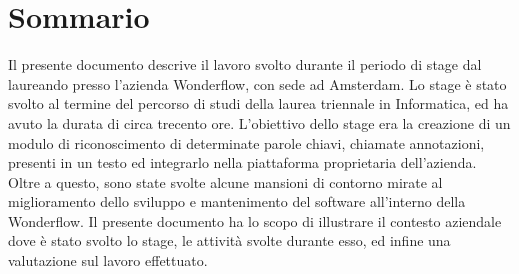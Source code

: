 \cleardoublepage
{}
\chapter*{Sommario}
\thispagestyle{empty}
Il presente documento descrive il lavoro svolto durante il periodo di stage dal
laureando \myName presso l’azienda Wonderflow, con sede ad Amsterdam.
Lo stage è stato svolto al termine del percorso di studi della laurea triennale
in Informatica, ed ha avuto la durata di circa trecento ore.
L’obiettivo dello stage era la creazione di un modulo di riconoscimento di
determinate parole chiavi, chiamate annotazioni, presenti in un testo ed
integrarlo nella piattaforma proprietaria dell'azienda. Oltre a questo, sono
state svolte alcune mansioni di contorno mirate al miglioramento dello sviluppo
e mantenimento del software all'interno della Wonderflow.
Il presente documento ha lo scopo di illustrare il contesto aziendale dove è
stato svolto lo stage, le attività svolte durante esso, ed infine una
valutazione sul lavoro effettuato.
\bigskip

